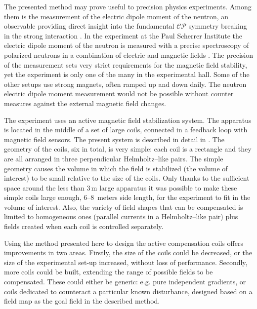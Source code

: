 

The presented method may prove useful to precision physics experiments. Among them is the measurement of the electric dipole moment of the neutron, an observable providing direct insight into the fundamental $\mathcal{CP}$ symmetry breaking in the strong interaction \cite{khriplovic:1997}. In the experiment at the Paul Scherrer Institute the electric dipole moment of the neutron is measured with a precise spectroscopy of polarized neutrons in a combination of electric and magnetic fields \cite{Baker2011}. The precision of the measurement sets very strict requirements for the magnetic field stability, yet the experiment is only one of the many in the experimental hall. Some of the other setups use strong magnets, often ramped up and down daily. The neutron electric dipole moment measurement would not be possible without counter measures against the external magnetic field changes.

The experiment uses an active magnetic field stabilization system. The apparatus is located in the middle of a set of large coils, connected in a feedback loop with magnetic field sensors. The present system is described in detail in \cite{Afach2014}. The geometry of the coils, six in total, is very simple: each coil is a rectangle and they are all arranged in three perpendicular Helmholtz--like pairs. The simple geometry causes the volume in which the field is stabilized (the volume of interest) to be small relative to the size of the coils. Only thanks to the sufficient space around the less than 3$\,$m large apparatus it was possible to make these simple coils large enough, 6--8$\,$ meters side length, for the experiment to fit in the volume of interest. Also, the variety of field shapes that can be compensated is limited to homogeneous ones (parallel currents in a Helmholtz--like pair) plus fields created when each coil is controlled separately.

Using the method presented here to design the active compensation coils offers improvements in two areas. Firstly, the size of the coils could be decreased, or the size of the experimental set-up increased, without loss of performance. Secondly, more coils could be built, extending the range of possible fields to be compensated. These could either be generic: e.g. pure independent gradients, or coils dedicated to counteract a particular known disturbance, designed based on a field map as the goal field in the described method.



